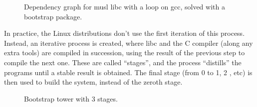 \begin{figure}[hbt]
    \centerfloat
    
    \caption{Dependency graph for musl libc with a loop on gcc, solved with a bootstrap package.}
    \label{fig:libc-deps4}
\end{figure}

In practice, the Linux distributions don't use the first
iteration of this process. Instead, an iterative process is
created, where libc and the C compiler (along any extra
tools) are compiled in succession, using the result of the
previous step to compile the next one. These are called
``stages'', and the process ``distills'' the programs until
a stable result is obtained. The final stage (from 0 to 1,
2 , etc) is then used to build the system, instead of the
zeroth stage.

\begin{figure}[hbt]
    \centerfloat
    
    \caption{Bootstrap tower with 3 stages.}
    \label{fig:libc-deps5}
\end{figure}
